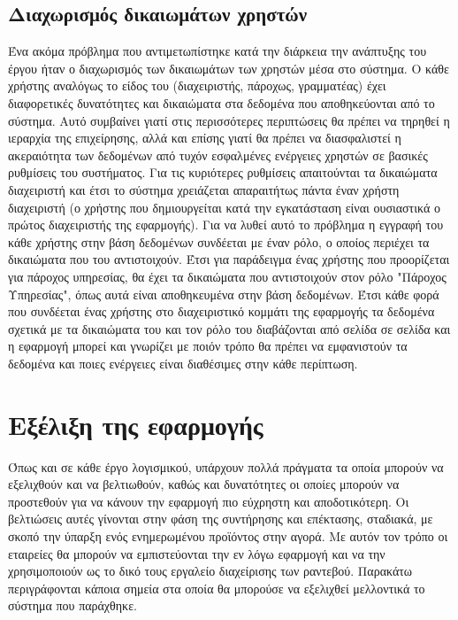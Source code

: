 \subsection{Διαχωρισμός δικαιωμάτων χρηστών}
Ένα ακόμα πρόβλημα που αντιμετωπίστηκε κατά την διάρκεια την ανάπτυξης του έργου ήταν ο διαχωρισμός των δικαιωμάτων των χρηστών μέσα στο σύστημα. Ο κάθε χρήστης αναλόγως το είδος του (διαχειριστής, πάροχως, γραμματέας) έχει διαφορετικές δυνατότητες και δικαιώματα στα δεδομένα που αποθηκεύονται από το σύστημα. Αυτό συμβαίνει γιατί στις περισσότερες περιπτώσεις θα πρέπει να τηρηθεί η ιεραρχία της επιχείρησης, αλλά και επίσης γιατί θα πρέπει να διασφαλιστεί η ακεραιότητα των δεδομένων από τυχόν εσφαλμένες ενέργειες χρηστών σε βασικές ρυθμίσεις του συστήματος. Για τις κυριότερες ρυθμίσεις απαιτούνται τα δικαιώματα διαχειριστή και έτσι το σύστημα χρειάζεται απαραιτήτως πάντα έναν χρήστη διαχειριστή (ο χρήστης που δημιουργείται κατά την εγκατάσταση είναι ουσιαστικά ο πρώτος διαχειριστής της εφαρμογής). Για να λυθεί αυτό το πρόβλημα η εγγραφή του κάθε χρήστης στην βάση δεδομένων συνδέεται με έναν ρόλο, ο οποίος περιέχει τα δικαιώματα που του αντιστοιχούν. Έτσι για παράδειγμα ένας χρήστης που προορίζεται για πάροχος υπηρεσίας, θα έχει τα δικαιώματα που αντιστοιχούν στον ρόλο "Πάροχος Υπηρεσίας", όπως αυτά είναι αποθηκευμένα στην βάση δεδομένων. Έτσι κάθε φορά που συνδέεται ένας χρήστης στο διαχειριστικό κομμάτι της εφαρμογής τα δεδομένα σχετικά με τα δικαιώματα του και τον ρόλο του διαβάζονται από σελίδα σε σελίδα και η εφαρμογή μπορεί και γνωρίζει με ποιόν τρόπο θα πρέπει να εμφανιστούν τα δεδομένα και ποιες ενέργειες είναι διαθέσιμες στην κάθε περίπτωση.

\section{Εξέλιξη της εφαρμογής}
Όπως και σε κάθε έργο λογισμικού, υπάρχουν πολλά πράγματα τα οποία μπορούν να εξελιχθούν και να βελτιωθούν, καθώς και δυνατότητες οι οποίες μπορούν να προστεθούν για να κάνουν την εφαρμογή πιο εύχρηστη και αποδοτικότερη. Οι βελτιώσεις αυτές γίνονται στην φάση της συντήρησης και επέκτασης, σταδιακά, με σκοπό την ύπαρξη ενός ενημερωμένου προϊόντος στην αγορά. Με αυτόν τον τρόπο οι εταιρείες θα μπορούν να εμπιστεύονται την εν λόγω εφαρμογή και να την χρησιμοποιούν ως το δικό τους εργαλείο διαχείρισης των ραντεβού. Παρακάτω περιγράφονται κάποια σημεία στα οποία θα μπορούσε να εξελιχθεί μελλοντικά το σύστημα που παράχθηκε.

